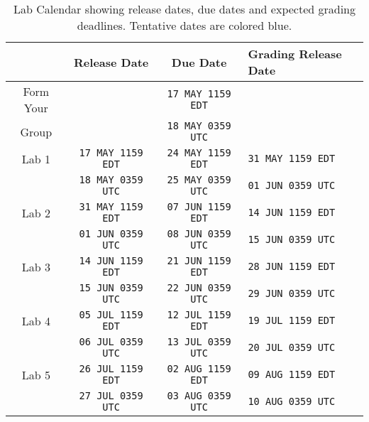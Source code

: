%
\begin{table}
  \centering
  \begin{tabular}{c|c|c|l}
      & Release Date & Due Date & Grading Release Date\\ \hline
    Form Your
      &
      & \texttt{17 MAY 1159 EDT}
      & \\
    Group
      &
      & \texttt{18 MAY 0359 UTC}
      & \\ \hline
    Lab 1
      & \texttt{17 MAY 1159 EDT}
      & \texttt{24 MAY 1159 EDT}
      & {\color{blue}\texttt{31 MAY 1159 EDT}}\\
      & \texttt{18 MAY 0359 UTC}
      & \texttt{25 MAY 0359 UTC}
      & {\color{blue}\texttt{01 JUN 0359 UTC}}\\ \hline
    Lab 2
      & {\color{blue}\texttt{31 MAY 1159 EDT}}
      & {\color{blue}\texttt{07 JUN 1159 EDT}}
      & {\color{blue}\texttt{14 JUN 1159 EDT}}\\
      & {\color{blue}\texttt{01 JUN 0359 UTC}}
      & {\color{blue}\texttt{08 JUN 0359 UTC}}
      & {\color{blue}\texttt{15 JUN 0359 UTC}}\\ \hline
    Lab 3
      & {\color{blue}\texttt{14 JUN 1159 EDT}}
      & {\color{blue}\texttt{21 JUN 1159 EDT}}
      & {\color{blue}\texttt{28 JUN 1159 EDT}}\\
      & {\color{blue}\texttt{15 JUN 0359 UTC}}
      & {\color{blue}\texttt{22 JUN 0359 UTC}}
      & {\color{blue}\texttt{29 JUN 0359 UTC}}\\ \hline
    Lab 4
      & {\color{blue}\texttt{05 JUL 1159 EDT}}
      & {\color{blue}\texttt{12 JUL 1159 EDT}}
      & {\color{blue}\texttt{19 JUL 1159 EDT}}\\
      & {\color{blue}\texttt{06 JUL 0359 UTC}}
      & {\color{blue}\texttt{13 JUL 0359 UTC}}
      & {\color{blue}\texttt{20 JUL 0359 UTC}}\\ \hline
    Lab 5
      & {\color{blue}\texttt{26 JUL 1159 EDT}}
      & {\color{blue}\texttt{02 AUG 1159 EDT}}
      & {\color{blue}\texttt{09 AUG 1159 EDT}}\\
      & {\color{blue}\texttt{27 JUL 0359 UTC}}
      & {\color{blue}\texttt{03 AUG 0359 UTC}}
      & {\color{blue}\texttt{10 AUG 0359 UTC}}
  \end{tabular}
  \caption[Lab Calendar]{%
    Lab Calendar showing release dates, due dates and expected grading
    deadlines. Tentative dates are colored blue.
  }
  \label{tab:labcalendar}
\end{table}

